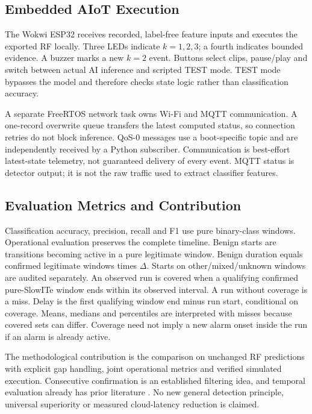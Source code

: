 \documentclass[conference]{IEEEtran}
\begin{document}
\subsection{Embedded AIoT Execution}

The Wokwi ESP32 receives recorded, label-free feature inputs and
executes the exported RF locally. Three LEDs indicate $k=1,2,3$;
a fourth indicates bounded evidence. A buzzer marks a new $k=2$ event.
Buttons select clips, pause/play and switch between actual AI inference
and scripted TEST mode. TEST mode bypasses the model and therefore
checks state logic rather than classification accuracy.

A separate FreeRTOS network task owns Wi-Fi and MQTT communication.
A one-record overwrite queue transfers the latest computed status,
so connection retries do not block inference. QoS-0 messages use a
boot-specific topic and are independently received by a Python
subscriber. Communication is best-effort latest-state telemetry,
not guaranteed delivery of every event. MQTT status is detector output;
it is not the raw traffic used to extract classifier features.

\subsection{Evaluation Metrics and Contribution}

Classification accuracy, precision, recall and F1 use pure binary-class
windows. Operational evaluation preserves the complete timeline.
Benign starts are transitions becoming active in a pure legitimate
window. Benign duration equals confirmed legitimate windows times
$\Delta$. Starts on other/\allowbreak mixed/\allowbreak unknown windows are audited separately.
An observed run is covered when a qualifying confirmed pure-SlowITe
window ends within its observed interval. A run without coverage is a
miss. Delay is the first qualifying window end minus run start,
conditional on coverage. Means, medians and percentiles are interpreted
with misses because covered sets can differ. Coverage need not imply
a new alarm onset inside the run if an alarm is already active.

The methodological contribution is the comparison on unchanged RF
predictions with explicit gap handling, joint operational metrics
and verified simulated execution. Consecutive confirmation is an
established filtering idea, and temporal evaluation already has prior
literature \cite{puccetti2026}. No new general detection principle,
universal superiority or measured cloud-latency reduction is claimed.
\end{document}
